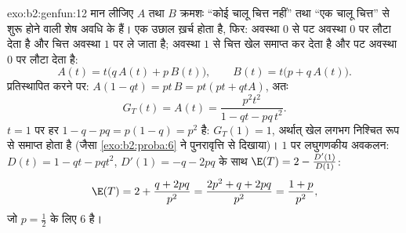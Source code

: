\begin{solution}{exo:b2:genfun:12}
मान लीजिए $A$ तथा $B$ क्रमशः ``कोई चालू चित्त नहीं'' तथा ``एक चालू
चित्त'' से शुरू होने वाली शेष अवधि के  हैं। एक उछाल ख़र्च
होता है, फिर: अवस्था $0$ से पट अवस्था $0$ पर लौटा देता है और चित्त
अवस्था $1$ पर ले जाता है; अवस्था $1$ से चित्त खेल समाप्त कर देता है
और पट अवस्था $0$ पर लौटा देता है:
\[
A(t) = t\bigl(q\,A(t) + p\,B(t)\bigr),
\qquad
B(t) = t\bigl(p + q\,A(t)\bigr).
\]
प्रतिस्थापित करने पर: $A(1 - qt) = pt\,B = pt(pt + qtA)$, अतः
\[
G_T(t) = A(t) = \frac{p^2t^2}{1 - qt - pq\,t^2} .
\]
$t = 1$ पर हर $1 - q - pq = p(1 - q) = p^2$ है: $G_T(1) = 1$, अर्थात् खेल लगभग निश्चित रूप से समाप्त
होता है (जैसा \cref{exo:b2:proba:6} ने पुनरावृत्ति से दिखाया)। $1$ पर लघुगणकीय
अवकलन: $D(t) = 1 - qt - pqt^2$, $D'(1) = -q - 2pq$ के साथ $\E(T) = 2 - \frac{D'(1)}{D(1)}$:
\[
\E(T) = 2 + \frac{q + 2pq}{p^2} = \frac{2p^2 + q + 2pq}{p^2}
= \frac{1 + p}{p^2},
\]
जो $p = \frac12$ के लिए $6$ है।
\end{solution}

